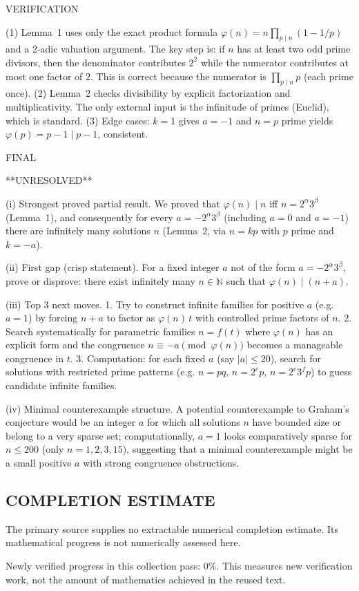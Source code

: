 VERIFICATION

(1) Lemma~1 uses only the exact product formula $\varphi(n)=n\prod_{p\mid n}(1-1/p)$ and a 2-adic valuation argument. The key step is: if $n$ has at least two odd prime divisors, then the denominator contributes $2^2$ while the numerator contributes at most one factor of $2$. This is correct because the numerator is $\prod_{p\mid n} p$ (each prime once).
(2) Lemma~2 checks divisibility by explicit factorization and multiplicativity. The only external input is the infinitude of primes (Euclid), which is standard.
(3) Edge cases: $k=1$ gives $a=-1$ and $n=p$ prime yields $\varphi(p)=p-1\mid p-1$, consistent.

FINAL

**UNRESOLVED**

(i) Strongest proved partial result.
We proved that $\varphi(n)\mid n$ iff $n=2^\alpha 3^\beta$ (Lemma~1), and consequently for every $a=-2^\alpha 3^\beta$ (including $a=0$ and $a=-1$) there are infinitely many solutions $n$ (Lemma~2, via $n=kp$ with $p$ prime and $k=-a$).

(ii) First gap (crisp statement).
For a fixed integer $a$ not of the form $a=-2^\alpha 3^\beta$, prove or disprove: there exist infinitely many $n\in\mathbb{N}$ such that $\varphi(n)\mid (n+a)$.

(iii) Top 3 next moves.
1. Try to construct infinite families for positive $a$ (e.g. $a=1$) by forcing $n+a$ to factor as $\varphi(n)\,t$ with controlled prime factors of $n$.
2. Search systematically for parametric families $n=f(t)$ where $\varphi(n)$ has an explicit form and the congruence $n\equiv -a\pmod{\varphi(n)}$ becomes a manageable congruence in $t$.
3. Computation: for each fixed $a$ (say $|a|\le 20$), search for solutions with restricted prime patterns (e.g. $n=pq$, $n=2^e p$, $n=2^e 3^f p$) to guess candidate infinite families.

(iv) Minimal counterexample structure.
A potential counterexample to Graham's conjecture would be an integer $a$ for which all solutions $n$ have bounded size or belong to a very sparse set; computationally, $a=1$ looks comparatively sparse for $n\le 200$ (only $n=1,2,3,15$), suggesting that a minimal counterexample might be a small positive $a$ with strong congruence obstructions.



\subsection*{COMPLETION ESTIMATE}
The primary source supplies no extractable numerical completion estimate. Its mathematical progress is not numerically assessed here.

Newly verified progress in this collection pass: $0\%$. This measures new verification work, not the amount of mathematics achieved in the reused text.
